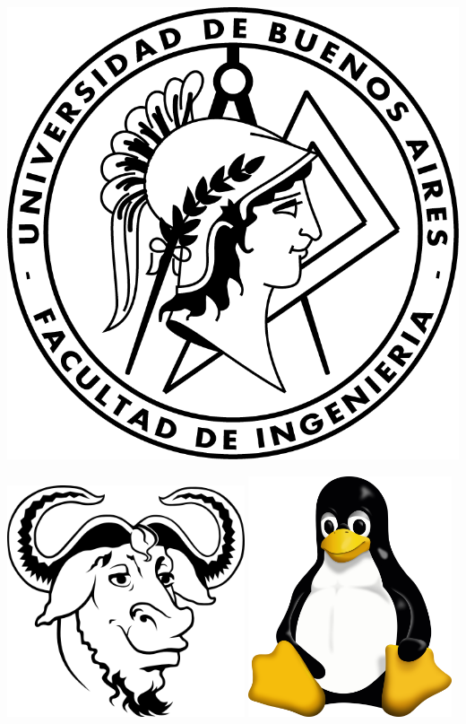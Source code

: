\documentclass{article}
\begin{document}
\begin{titlepage}
  \begin{center}
    \includegraphics[scale=0.8]{media/Logo-fiuba.png}
  \end{center}
  \hspace*{-2cm}                                                           
    \includegraphics[width=7cm]{media/GNU.png}
  \hspace*{3cm}                                                           
  \hspace{2.8cm}
    \includegraphics[width=6cm]{media/Tux.png}

\end{titlepage}
\end{document}
